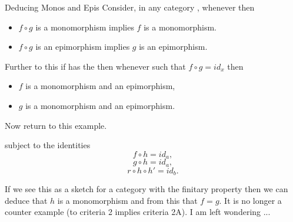 \begin{frame}{Deducing Monos and Epis}
Consider, in any category \catcw, whenever  then
\begin{itemize}
\item $f \circ g$ is a monomorphism implies $f$ is a monomorphism.
\item $f \circ g$ is an epimorphism implies $g$ is an epimorphism.
\end{itemize}
\medskip
Further to this if \catcw has the  then whenever  
such that $f \circ g = id_x$ then
\begin{itemize}
\item $f$ is a monomorphism and an epimorphism,
\item $g$ is a monomorphism and an epimorphism.
\end{itemize}
\end{frame}

\begin{frame}
Now return to this example.

subject to the identities
\begin{equation}
\label{fhidentity}
f \circ h = id_a,
\end{equation}
\begin{equation}
\label{ghidentity}
g \circ h = id_a,
\end{equation}
\begin{equation}
\label{rhhpidentity}
r \circ h \circ h' = id_b.
\end{equation}

If we see this as a sketch for a category with the finitary property then we can deduce that $h$ is a monomorphism
and from this that $f=g$.  It is no longer a counter example (to criteria 2 implies criteria 2A).
\medskip
I am left wondering ...  
\end{frame}


